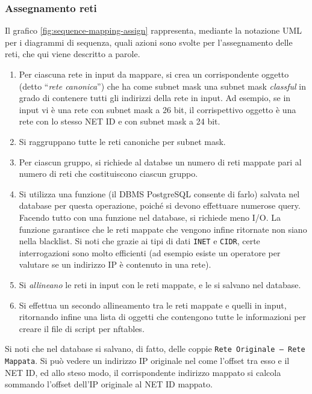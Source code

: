 \subsubsection{Assegnamento reti}
Il grafico \ref{fig:sequence-mapping-assign} rappresenta, mediante la notazione UML per
i diagrammi di sequenza, quali azioni sono svolte per l'assegnamento delle reti, che
qui viene descritto a parole.
\begin{enumerate}
	\item Per ciascuna rete in input da mappare, si crea un corrispondente oggetto (detto
	      ``\textit{rete canonica}'') che
	      ha come subnet mask una subnet mask \textit{classful} in grado di contenere tutti
	      gli indirizzi della rete in input. Ad esempio, se in input vi è una rete con subnet
	      mask a 26 bit, il corrispettivo oggetto è una rete con lo stesso NET ID e con
	      subnet mask a 24 bit.
	\item Si raggruppano tutte le reti canoniche per subnet mask.
	\item Per ciascun gruppo, si richiede al databse un numero di reti mappate pari
	      al numero di reti che costituiscono ciascun gruppo.
	\item Si utilizza una funzione
	      (il DBMS PostgreSQL consente di farlo) salvata nel database per questa operazione,
	      poiché si devono effettuare numerose query. Facendo tutto con una funzione nel database,
	      si richiede meno I/O. La funzione garantisce che le reti mappate che vengono
	      infine ritornate non siano nella blacklist. Si noti che grazie ai tipi di dati
	      \texttt{INET}  e \texttt{CIDR}, certe interrogazioni sono molto efficienti
	      (ad esempio esiste un operatore per valutare se un indirizzo IP è contenuto in una
	      rete).
	\item Si \textit{allineano} le reti in input con le reti mappate, e le si salvano
	      nel database.
	\item Si effettua un secondo allineamento tra le reti mappate e quelli in input,
	      ritornando infine una lista di oggetti che contengono tutte le informazioni
	      per creare il file di script per nftables.
\end{enumerate}
Si noti che nel database si salvano, di fatto, delle coppie \texttt{Rete Originale -- Rete Mappata}.
Si può vedere un indirizzo IP originale nel come l'offset tra esso e il NET ID, ed
allo steso modo, il corrispondente indirizzo mappato si calcola sommando l'offset dell'IP
originale al NET ID mappato.

